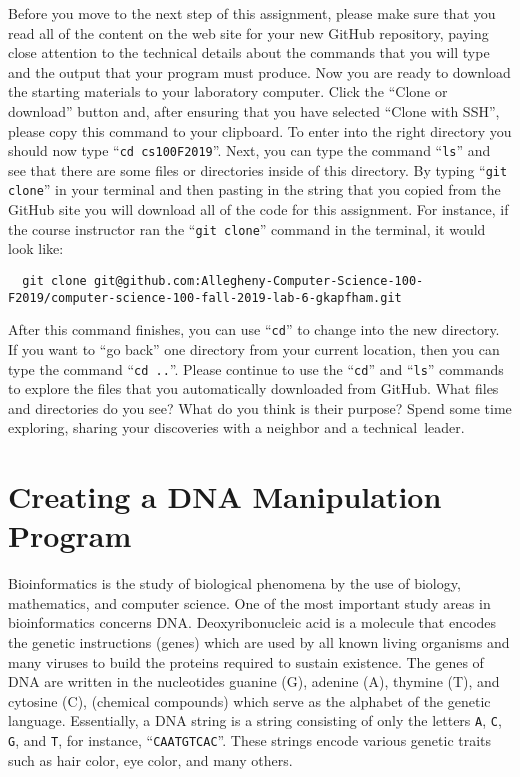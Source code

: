 \documentclass[11pt]{article}
\newcommand{\command}[1]{``\lstinline{#1}''}
\newcommand{\step}[1]{``{#1}''}
\begin{document}
Before you move to the next step of this assignment, please make sure that you
read all of the content on the web site for your new GitHub repository, paying
close attention to the technical details about the commands that you will type
and the output that your program must produce. Now you are ready to download the
starting materials to your laboratory computer. Click the ``Clone or download''
button and, after ensuring that you have selected ``Clone with SSH'', please
copy this command to your clipboard. To enter into the right directory you
should now type \command{cd cs100F2019}. Next, you can type the command
\command{ls} and see that there are some files or directories inside of this
directory. By typing \command{git clone} in your terminal and then pasting in
the string that you copied from the GitHub site you will download all of the
code for this assignment. For instance, if the course instructor ran the
\command{git clone} command in the terminal, it would look like:

\begin{lstlisting}
  git clone git@github.com:Allegheny-Computer-Science-100-F2019/computer-science-100-fall-2019-lab-6-gkapfham.git
\end{lstlisting}

After this command finishes, you can use \command{cd} to change into the new
directory. If you want to \step{go back} one directory from your current
location, then you can type the command \command{cd ..}. Please continue to use
the \command{cd} and \command{ls} commands to explore the files that you
automatically downloaded from GitHub. What files and directories do you see?
What do you think is their purpose? Spend some time exploring, sharing your
discoveries with a neighbor and a \mbox{technical leader}.

\section*{Creating a DNA Manipulation Program}

Bioinformatics is the study of biological phenomena by the use of biology,
mathematics, and computer science. One of the most important study areas in
bioinformatics concerns DNA. Deoxyribonucleic acid is a molecule that encodes
the genetic instructions (genes) which are used by all known living organisms
and many viruses to build the proteins required to sustain existence. The genes
of DNA are written in the nucleotides guanine (G), adenine (A), thymine (T), and
cytosine (C), (chemical compounds) which serve as the alphabet of the genetic
language.  Essentially, a DNA string is a string consisting of only the letters
{\tt A}, {\tt C}, {\tt G}, and {\tt T}, for instance, ``{\tt CAATGTCAC}''. These
strings encode various genetic traits such as hair color, eye color, and many
others.
\end{document}
